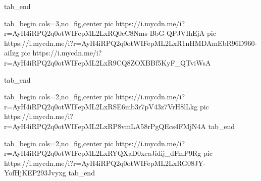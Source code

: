   tab_end
\fi

\ifcmt
  tab_begin cols=3,no_fig,center
		pic https://i.mycdn.me/i?r=AyH4iRPQ2q0otWIFepML2LxRQ0cC8Nms-BbG-QPJVIhEjA
		pic https://i.mycdn.me/i?r=AyH4iRPQ2q0otWIFepML2LxR1nHMDAmEbR96D960-aiIzg
		pic https://i.mycdn.me/i?r=AyH4iRPQ2q0otWIFepML2LxR9CQ8ZOXBBf5KyF_QTviWsA

  tab_end
\fi

\ifcmt
  tab_begin cols=2,no_fig,center
		pic https://i.mycdn.me/i?r=AyH4iRPQ2q0otWIFepML2LxRSE6mb3r7pV43z7VrH8lLkg
		pic https://i.mycdn.me/i?r=AyH4iRPQ2q0otWIFepML2LxRP8vmLA58rPgQEcs4FMjN4A
  tab_end
\fi

\ifcmt
  tab_begin cols=2,no_fig,center
		pic https://i.mycdn.me/i?r=AyH4iRPQ2q0otWIFepML2LxRYQXaD0xcaJidij_dFmP9Rg
		pic https://i.mycdn.me/i?r=AyH4iRPQ2q0otWIFepML2LxRG08JY-YofHjKEP293Jvyxg
  tab_end
\fi
